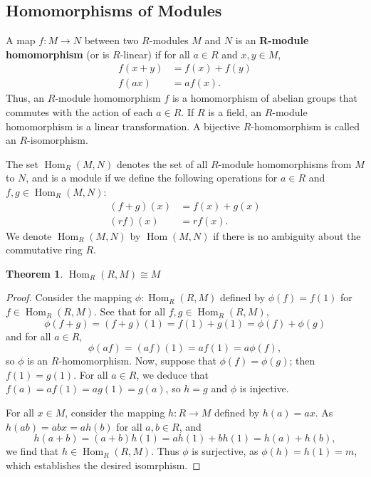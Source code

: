 \documentclass[11pt]{article}
\newtheorem{theorem}{Theorem}
\newcommand{\Hom}{\operatorname{Hom}}
\begin{document}

\subsection{Homomorphisms of Modules}

A map $f: M \to N$ between two $R$-modules $M$ and $N$ is an \textbf{R-module homomorphism} (or is $R$-linear) if for all $a \in R$ and $x, y \in M$,
\begin{align*}
	f(x + y) & = f(x) + f(y) \\
	f(ax)    & = a f(x).
\end{align*}
Thus, an $R$-module homomorphism $f$ is a homomorphism of abelian groups that commutes with the action of each $a \in R$. If $R$ is a field, an $R$-module homomorphism is a linear transformation. A bijective $R$-homomorphism is called an $R$-isomorphism.

\newpage

The set $\Hom_{R}(M, N)$ denotes the set of all $R$-module homomorphisms from $M$ to $N$, and is a module if we define the following operations for $a \in R$ and $f, g \in \Hom_{R}(M, N)$:
\begin{align*}
	(f + g)(x) & = f(x) + g(x) \\
	(rf)(x)    & = r f(x).
\end{align*}
We denote $\Hom_{R}(M, N)$ by $\Hom(M, N)$ if there is no ambiguity about the commutative ring $R$.

\begin{adjustwidth}{1cm}{}
	\begin{theorem}
		$\Hom_{R}(R, M) \cong M$
	\end{theorem}
	\begin{proof}
		Consider the mapping $\phi : \Hom_{R}(R, M)$ defined by $\phi(f) = f(1)$ for $f \in \Hom_{R}(R, M)$. See that for all $f, g \in \Hom_{R}(R, M)$,
		\[
			\phi(f + g) = (f + g)(1) = f(1) + g(1) = \phi(f) + \phi(g)
		\]
		and for all $a \in R$,
		\[
			\phi(af) = (af)(1) = a f(1) = a \phi(f),
		\]
		so $\phi$ is an $R$-homomorphism. Now, suppose that $\phi(f) = \phi(g)$; then $f(1) = g(1)$. For all $a \in R$, we deduce that $f(a) = a f(1) = a g(1) = g(a)$, so $h = g$ and $\phi$ is injective.

		For all $x \in M$, consider the mapping $h : R \to M$ defined by $h(a) = ax$. As $h(ab) = abx = a h(b)$ for all $a, b \in R$, and
		\[
			h(a + b) = (a + b) h(1) = a h(1) + b h(1) = h(a) + h(b),
		\]
		we find that $h \in \Hom_{R}(R, M)$. Thus $\phi$ is surjective, as $\phi(h) = h(1) = m$, which establishes the desired isomrphism.
	\end{proof}
\end{adjustwidth}
\end{document}
